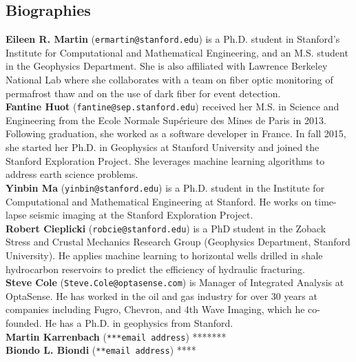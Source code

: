 \documentclass[11pt]{article}
\begin{document}
\vspace{-0.9cm}
\subsection*{Biographies}
\small
\vspace{-0.2cm}
\textbf{Eileen R. Martin} (\texttt{ermartin@stanford.edu}) is a Ph.D. student in Stanford's Institute for Computational and Mathematical Engineering, and an M.S. student in the Geophysics Department. She is also affiliated with Lawrence Berkeley National Lab where she collaborates with a team on fiber optic monitoring of permafrost thaw and on the use of dark fiber for event detection.
\\
\textbf{Fantine Huot} (\texttt{fantine@sep.stanford.edu}) received her M.S. in Science and Engineering from the Ecole Normale Sup\'erieure des Mines de Paris in 2013. Following graduation, she worked as a software developer in France. In fall 2015, she started her Ph.D. in Geophysics at Stanford University and joined the Stanford Exploration Project. She leverages machine learning algorithms to address earth science problems.
\\
\textbf{Yinbin Ma} (\texttt{yinbin@stanford.edu}) is a Ph.D. student in the Institute for Computational and Mathematical Engineering at Stanford. He works on time-lapse seismic imaging at the Stanford Exploration Project.
\\
\textbf{Robert Cieplicki} (\texttt{robcie@stanford.edu}) is a PhD student in the Zoback Stress and Crustal Mechanics Research Group (Geophysics Department, Stanford University). He applies machine learning to horizontal wells drilled in shale hydrocarbon reservoirs to predict the efficiency of hydraulic fracturing.
\\
\textbf{Steve Cole} (\texttt{Steve.Cole@optasense.com}) is Manager of Integrated Analysis at OptaSense. He has worked in the oil and gas industry for over 30 years at companies including Fugro, Chevron, and 4th Wave Imaging, which he co-founded. He has a Ph.D. in geophysics from Stanford.
\\
\textbf{Martin Karrenbach} (\texttt{***email address}) *******
\\
\textbf{Biondo L. Biondi} (\texttt{**email address}) ****
\end{document}
